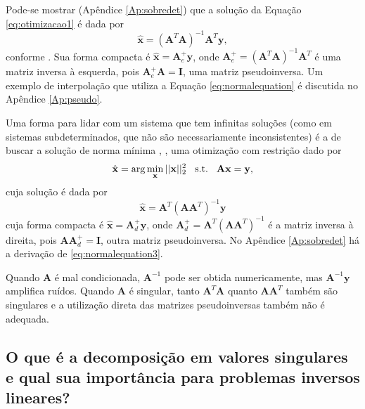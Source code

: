 Pode-se mostrar (Apêndice \ref{Ap:sobredet}) que a solução da Equação \eqref{eq:otimizacao1} é dada por 
\begin{equation}
\hat{\mathbf{x}} = \left(\mathbf{A}^T \mathbf{A} \right)^{-1} \mathbf{A}^T \mathbf{y},
\label{eq:normalequation}
\end{equation}
conforme \cite[pág. 260]{golub2013matrix}. Sua forma compacta é $\hat{\mathbf{x}} =\mathbf{A}^+_e \mathbf{y}$, onde $\mathbf{A}^+_e = \left(\mathbf{A}^T \mathbf{A} \right)^{-1} \mathbf{A}^T$ é uma matriz inversa à esquerda, pois $\mathbf{A}^{+}_e \mathbf{A}=\mathbf{I}$, uma matriz pseudoinversa. Um exemplo de interpolação que utiliza a Equação \eqref{eq:normalequation} é discutida no Apêndice \ref{Ap:pseudo}.

Uma forma para lidar com um sistema que tem infinitas soluções (como em sistemas subdeterminados, que não são necessariamente inconsistentes) é a de buscar a solução de norma mínima \cite[pág. 62]{calvetti2007introduction}, \cite[pág. 46]{goodfellow2016deep}, uma otimização com restrição dado por
\begin{equation}
\hat{\mathbf{x}} = \arg\min\limits_{\mathbf{x}}\vert \vert \mathbf{x} \vert \vert_2^2 \hspace{3mm} \text{s.t.}\hspace{3mm} \mathbf{A} \mathbf{x}= \mathbf{y},
\label{eq:casosub_sol}
\end{equation}
cuja solução é dada por \cite[Seção 2.3]{Monticelli2012}
\begin{equation}
\hat{\mathbf{x}} = \mathbf{A}^T \left(\mathbf{A} \mathbf{A}^T\right)^{-1} \mathbf{y} 
\label{eq:normalequation3}
\end{equation}
cuja forma compacta é $\hat{\mathbf{x}} = \mathbf{A}^+_d \mathbf{y}$, onde $\mathbf{A}^+_d = \mathbf{A}^T \left(\mathbf{A} \mathbf{A}^T\right)^{-1}$ é a matriz inversa à direita, pois $\mathbf{A}\mathbf{A}^{+}_d=\mathbf{I}$, outra matriz pseudoinversa. No Apêndice \ref{Ap:sobredet} há a derivação de \eqref{eq:normalequation3}.

Quando $\mathbf{A}$ é mal condicionada, $\mathbf{A}^{-1}$ pode ser obtida numericamente, mas $\mathbf{A}^{-1}\mathbf{y}$ amplifica  ruídos. Quando $\mathbf{A}$ é singular, tanto $\mathbf{A}^T \mathbf{A}$ quanto $\mathbf{A} \mathbf{A}^T$ também são singulares e a utilização direta das matrizes pseudoinversas também não é adequada.  

\subsection{O que é a decomposição em valores singulares e qual sua importância para problemas inversos lineares?}\label{app-svd}

